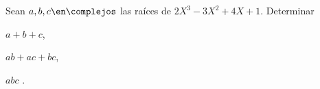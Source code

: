 \begin{enunciado}{\ejercicio}
  Sean $a, b, c \en \complejos$ las raíces de $2X^3 - 3X^2 + 4X + 1$. Determinar
  \begin{enumerate}[label=\roman*)]
    \begin{multicols}{3}
      \item $a + b + c$,
      \item $ab + ac + bc$,
      \item $abc$ .
    \end{multicols}
  \end{enumerate}
\end{enunciado}
\hacer
